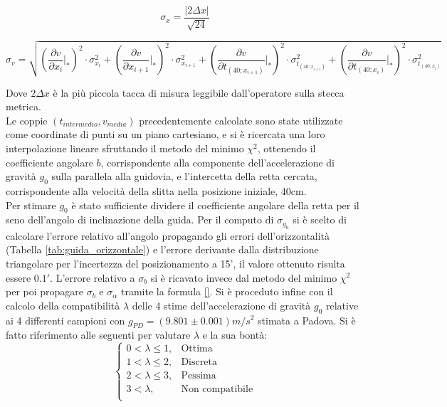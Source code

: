 \documentclass[a4paper,11pt,oneside]{article}
\begin{document}
\begin{equation*}%
\sigma_{x}=\frac{\mathopen|2\Delta x\mathclose|}{\sqrt{24}} 
\end{equation*}

\begin{equation*}
\label{eq:propagazione_velocità}
    \sigma_{v}= \sqrt{
   \left( {\frac{\partial v}{\partial x_{i}}} \Big|_{\ast}\right)^{2} \cdot \sigma_{x_{i}}^2  +   
   \left( {\frac{\partial v}{\partial x_{i+1}}}\Big|_{\ast}\right )^{2} \cdot \sigma_{x_{i+1}}^2   +   
   \left( {\frac{\partial v}{\partial t_{\left(40; x_{i+1}\right)}}}\Big|_{\ast}\right)^{2}  \cdot \sigma_{t_{\left(40; x_{i+1}\right)}}^2 +   
       \left( {\frac{\partial v}{\partial t_{\left(40; x_i\right)}}}\Big|_{\ast}\right)^{2} \cdot  \sigma_{t_{\left(40; x_i\right)}}^2
    }
\end{equation*}

Dove $2\Delta x$ è la più piccola tacca di misura leggibile dall'operatore sulla stecca metrica.\\
Le coppie $(t_{intermedio}, v_{media})$ precedentemente calcolate sono state utilizzate come coordinate di punti su un piano cartesiano, e si è ricercata una loro interpolazione lineare sfruttando il metodo del minimo ${\chi}^2$, ottenendo il coefficiente angolare $b$, corrispondente alla componente dell'accelerazione di gravità $g_{0}$ sulla parallela alla guidovia, e l'intercetta della retta cercata, corrispondente alla velocità della slitta nella posizione iniziale, 40cm.\\
Per stimare $g_{0}$ è stato sufficiente dividere il coefficiente angolare della retta per il seno dell'angolo di inclinazione della guida.
Per il computo di $ \sigma_{g_{0}}$ si è scelto di calcolare l'errore relativo all'angolo propagando gli errori dell'orizzontalità (Tabella \ref{tab:guida_orizzontale}) e l'errore derivante dalla distribuzione triangolare per l'incertezza del posizionamento a 15', il valore ottenuto risulta essere $0.1'$. L'errore relativo a $\sigma_b$  si è ricavato invece dal metodo del minimo ${\chi}^2$ per poi propagare $\sigma_b$ e $\sigma_{\alpha}$ tramite la formula \ref{}. Si è proceduto infine con il calcolo della compatibilità $\lambda$ delle 4 stime dell'accelerazione di gravità $g_{0}$ relative ai 4 differenti campioni con $g_{PD}=(9.801\pm 0.001)\si{m/s^2}$ stimata a Padova. Si è fatto riferimento alle seguenti per valutare $\lambda$ e la sua bontà:
\begin{equation*}%
    \label{eq:cases}
    \begin{cases}
    0<\lambda\leq 1, & \text{Ottima}\\
    1<\lambda\leq2, & \text{Discreta}\\
    2<\lambda\leq3, & \text{Pessima}\\
    3<\lambda, & \text{Non compatibile}\\
    \end{cases}
\end{equation*}
\end{document}

